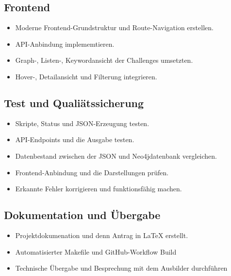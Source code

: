 \subsection{Frontend}

\begin{itemize}[itemsep=0.4pt]
    \item Moderne Frontend-Grundstruktur und Route-Navigation erstellen.
    \item API-Anbindung implememtieren.
    \item Graph-, Listen-, Keywordansicht der Challenges umsetzten.
    \item Hover-, Detailansicht und Filterung integrieren.
\end{itemize}

\subsection{Test und Qualiätssicherung}

\begin{itemize}[itemsep=0.4pt]
    \item Skripte, Status und JSON-Erzeugung testen.
    \item API-Endpoints und die Ausgabe testen.
    \item Datenbestand zwischen der JSON und Neo4jdatenbank vergleichen.
    \item Frontend-Anbindung und die Darstellungen prüfen.
    \item Erkannte Fehler korrigieren und funktionsfähig machen.
\end{itemize}

\subsection{Dokumentation und Übergabe}

\begin{itemize}[itemsep=0.4pt]
    \item Projektdokumenation und denn Antrag in LaTeX erstellt.
    \item Automatisierter Makefile und GitHub-Workflow Build
    \item Technische Übergabe und Besprechung mit dem Ausbilder durchführen
\end{itemize}